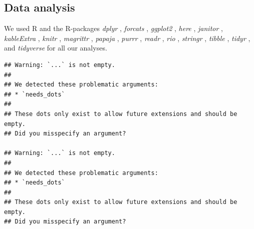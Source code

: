 \documentclass[
  english,
  man]{apa6}
\begin{document}
\hypertarget{data-analysis}{%
\subsection{Data analysis}\label{data-analysis}}

We used R \autocite[Version 3.6.1;][]{R-base} and the R-packages \emph{dplyr} \autocite[Version 1.0.0;][]{R-dplyr}, \emph{forcats} \autocite[Version 0.5.0;][]{R-forcats}, \emph{ggplot2} \autocite[Version 3.3.2;][]{R-ggplot2}, \emph{here} \autocite[Version 0.1;][]{R-here}, \emph{janitor} \autocite[Version 2.0.1;][]{R-janitor}, \emph{kableExtra} \autocite[Version 1.3.1;][]{R-kableExtra}, \emph{knitr} \autocite[Version 1.29;][]{R-knitr}, \emph{magrittr} \autocite[Version 1.5;][]{R-magrittr}, \emph{papaja} \autocite[Version 0.1.0.9997;][]{R-papaja}, \emph{purrr} \autocite[Version 0.3.4;][]{R-purrr}, \emph{readr} \autocite[Version 1.3.1;][]{R-readr}, \emph{rio} \autocite[Version 0.5.16;][]{R-rio}, \emph{stringr} \autocite[Version 1.4.0;][]{R-stringr}, \emph{tibble} \autocite[Version 3.0.2;][]{R-tibble}, \emph{tidyr} \autocite[Version 1.1.0;][]{R-tidyr}, and \emph{tidyverse} \autocite[Version 1.3.0;][]{R-tidyverse} for all our analyses.

\begin{verbatim}
## Warning: `...` is not empty.
## 
## We detected these problematic arguments:
## * `needs_dots`
## 
## These dots only exist to allow future extensions and should be empty.
## Did you misspecify an argument?

## Warning: `...` is not empty.
## 
## We detected these problematic arguments:
## * `needs_dots`
## 
## These dots only exist to allow future extensions and should be empty.
## Did you misspecify an argument?
\end{verbatim}
\end{document}
